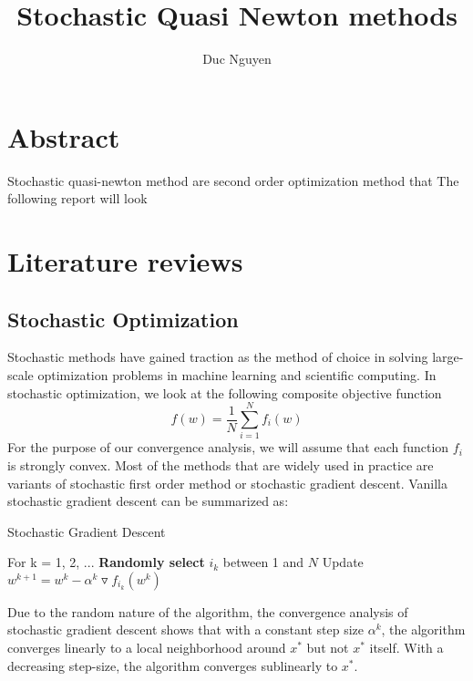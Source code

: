 \documentclass[journal,onecolumn]{IEEEtran}
\begin{document}
\title{Stochastic Quasi Newton methods}
\author{Duc Nguyen}
\maketitle

\section{Abstract}
Stochastic quasi-newton method are second order optimization method that 
The following report will look

\section{Literature reviews}

\subsection{Stochastic Optimization}
Stochastic methods have gained traction as the method of choice in solving large-scale optimization problems in machine learning and scientific computing. In stochastic optimization, we look at the following composite objective function
\begin{equation*}
	f(w) = \frac{1}{N}\underset{i=1}{\overset{N}{\sum}}f_i(w)
\end{equation*}
For the purpose of our convergence analysis, we will assume that each function $ f_i $ is strongly convex. 
Most of the methods that are widely used in practice are variants of stochastic first order method or stochastic gradient descent. Vanilla stochastic gradient descent can be summarized as:
\begin{algorithm}[H]
	\caption{Stochastic Gradient Descent}
	\begin{algorithmic}
		\STATE For k = 1, 2, ...
		\STATE \hspace{2em} \textbf{Randomly select} $ i_k $ between 1 and $ N $
		\STATE \hspace{2em} Update $ w^{k+1}=w^k-\alpha^k \triangledown f_{i_k}(w^k) $
	\end{algorithmic}
\end{algorithm} 
Due to the random nature of the algorithm, the convergence analysis of stochastic gradient descent shows that with a constant step size $ \alpha^k $, the algorithm converges linearly to a local neighborhood around $ x^* $ but not $ x^* $ itself. With a decreasing step-size, the algorithm converges sublinearly to $ x^* $. 
\end{document}

